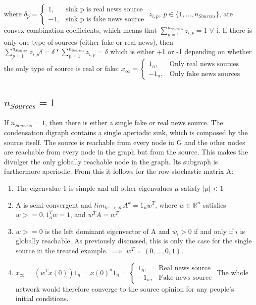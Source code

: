 where 
$
\delta_p = 
\begin{cases}
1,& \text{sink p is real news source}\\
-1,& \text{sink p is fake news source}
\end{cases}
$
$z_{i,p},\ p\in\{1,...,n_{Sources}\}$, are convex combination coefficients, which means that $\sum_{p=1}^{n_{Sources}} z_{i,p} = 1$ $\forall$ i.
If there is only one type of sources (either fake or real news), then $\sum_{p=1}^{n_{Sources}} z_{i,p}\delta = \delta*\sum_{p=1}^{n_{Sources}} z_{i,p} = \delta$ which is either +1 or -1 depending on whether the only type of source is real or fake: 
$x_\infty = 
\begin{cases}
1_n,& \text{Only real news sources}\\
-1_n,& \text{Only fake news sources}
\end{cases}$ 
\subsection{$n_{Sources} = 1$}
If $n_{Sources}=1$, then there is either a single fake or real news source. The condensation digraph contains a single aperiodic sink, which is composed by the source itself. The source is reachable from every node in G and the other nodes are reachable from every node in the graph but from the source. This makes the divulger the only globally reachable node in the graph. Its subgraph is furthermore aperiodic. From this it follows for the row-stochastic matrix A:
\begin{enumerate}
	\item
	The eigenvalue 1 is simple and all other eigenvalues $\mu$ satisfy $|\mu|<1$
	\item
	A is semi-convergent and $lim_{k->\infty} A^k = 1_n w^T$, where $w \in \mathbb{R}^n$ satisfies $w>=0, 1_n^T w = 1$, and $w^TA=w^T$
	\item
	$w>=0$ is the left dominant eigenvector of A and $w_i>0$ if and only if $i$ is globally reachable. As previously discussed, this is only the case for the single source in the treated example. \newline
	$\implies$ $w^T = (0,...,0,1)$.
	\item
	$x_\infty = (w^T x(0))1_n = x(0)^n 1_n = 	\begin{cases}
	1_n,& \text{Real news source}\\
	-1_n, & \text{Fake news source}
	\end{cases}$
	\newline The whole network would therefore converge to the source opinion for any people's initial conditions.
\end{enumerate}